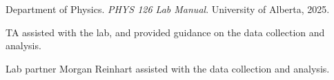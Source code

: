 \documentclass[12pt]{article}
\begin{document}
\begin{thebibliography}{9}

    Department of Physics. \textit{PHYS 126 Lab Manual}. University of Alberta, 2025.

    TA assisted with the lab, and provided guidance on the data collection and analysis.

    Lab partner Morgan Reinhart assisted with the data collection and analysis.
    
\end{thebibliography}
\end{document}
